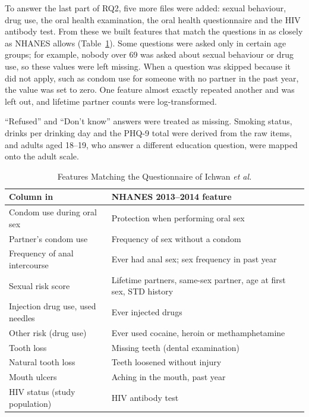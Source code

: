 \documentclass[conference]{IEEEtran}
\begin{document}
To answer the last part of RQ2, five more files were added: sexual behaviour, drug use, the oral health examination, the oral health questionnaire and the HIV antibody test. From these we built features that match the questions in \cite{ichwan} as closely as NHANES allows (Table~\ref{tab:paper}). Some questions were asked only in certain age groups; for example, nobody over 69 was asked about sexual behaviour or drug use, so these values were left missing. When a question was skipped because it did not apply, such as condom use for someone with no partner in the past year, the value was set to zero. One feature almost exactly repeated another and was left out, and lifetime partner counts were log-transformed.

``Refused'' and ``Don't know'' answers were treated as missing. Smoking status, drinks per drinking day and the PHQ-9 total were derived from the raw items, and adults aged 18--19, who answer a different education question, were mapped onto the adult scale.

\begin{table}[t]
\caption{Features Matching the Questionnaire of Ichwan \textit{et al.} \cite{ichwan}}
\label{tab:paper}
\centering
\small
\begin{tabular}{p{}p{}}
\toprule
Column in \cite{ichwan} & NHANES 2013--2014 feature \\
\midrule
Condom use during oral sex & Protection when performing oral sex \\
Partner's condom use & Frequency of sex without a condom \\
Frequency of anal intercourse & Ever had anal sex; sex frequency in past year \\
Sexual risk score & Lifetime partners, same-sex partner, age at first sex, STD history \\
Injection drug use, used needles & Ever injected drugs \\
Other risk (drug use) & Ever used cocaine, heroin or methamphetamine \\
Tooth loss & Missing teeth (dental examination) \\
Natural tooth loss & Teeth loosened without injury \\
Mouth ulcers & Aching in the mouth, past year \\
HIV status (study population) & HIV antibody test \\
\bottomrule
\end{tabular}
\end{table}
\end{document}
